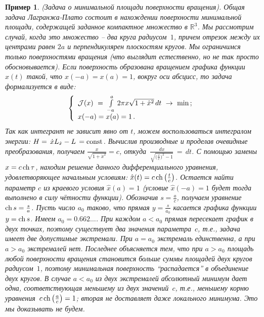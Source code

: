 \documentclass[12pt,a4paper]{article}
\newtheorem{ex}{Пример}
\newcommand{\re}{{\mathbb R}}
\newcommand{\cJ}{{\cal{J}}}
\newcommand{\cho}{{\rm ch}\, }
\begin{document}
\begin{ex}\label{ex.area}(Задача о минимальной площади поверхности вращения).
{\em Общая задача Лагранжа-Плато состоит в нахождении поверхности минимальной площади,
содержащей заданное компактное множество в $\re^3$. Мы рассмотрим случай, когда это множество --
два круга радиусом~$1$, причем отрезок между их центрами равен $2a$ и перпендикулярен  плоскостям
 кругов. Мы ограничимся только поверхностями
вращения (что выглядит естественно, но не так просто обосновывается). Если поверхность
 образована вращением графика функции $x(t)$ такой, что $x(-a) = x(a) = 1$, вокруг оси абсцисс, то задача
 формализуется в виде:
\begin{equation}\label{eq.area}
\left\{
\begin{array}{l}
\cJ(x) \ = \ \int\limits_{-a}^a \, 2\pi x \sqrt{1 + \dot x^2}\, d t \ \to \ \min\, ;\\
x(-a) = x(a) = 1\, .
\end{array}
\right.
\end{equation}
Так как интегрант не зависит явно от $t$, можем воспользоваться интегралом энергии:
$H = \, \dot x L_{\dot x} - L \, = {\rm const}$. Вычислив производные и проделав очевидные преобразования,
получаем $\frac{x}{\sqrt{1 + \dot x^2}} = c$, откуда $\, \frac{d x}{\sqrt{\bigl(\frac{x}{c}\bigr)^2-1}}\, = \, d t$.
С помощью замены $x = c \, \cho \tau$, находим решение данного дифференциального уравнения, удовлетворяющее
начальным условиям: $\hat x (t)=  c \, \cho \bigl( \frac{t}{c}\bigr)$. Остается найти параметр $c$ из краевого условия $\hat x (a) = 1$ (условие $\hat x(-a)=1$ будет тогда выполнено в силу чётности функции). Обозначив $s = \frac{a}{c}$,
получаем уравнение $\cho s = \frac{s}{a}$. Пусть число $a_0$ таково, что прямая $y = \frac{s}{a_0}$ касается
графика функции $y = \cho s$. 
Имеем $a_0 = 0.662\ldots $. При каждом $a < a_0$ прямая пересекает
график в  двух точках, поэтому существует два значения параметра~$c$, т.е., задача имеет две допустимые экстремали.
При $a = a_0$ экстремаль единственна, а при $a> a_0$ экстремалей нет. Последнее объясняется тем, что
при $a> a_0$  площадь любой поверхности вращения становится больше суммы площадей двух кругов радиусом~$1$, поэтому
минимальная поверхность ``распадается'' в объединение двух кругов. В случае $a< a_0$ из двух экстремалей
абсолютный минимум дает одна, соответствующая меньшему из двух значений~$c$, т.е., меньшему
корню уравнения $\, c\, \cho \bigl(\frac{a}{c} \bigr) =1 $; вторая не доставляет даже локального минимума. Это мы доказывать не будем.
}
\end{ex}
\end{document}
